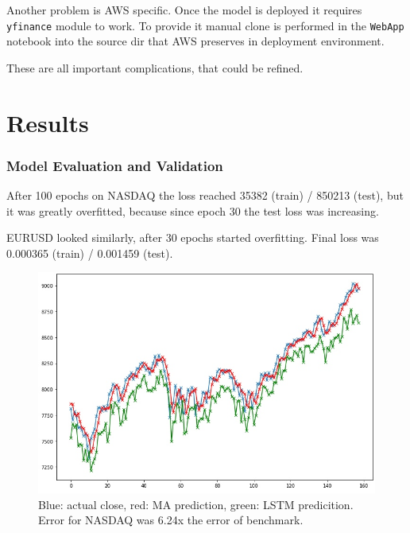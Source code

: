 \documentclass[a4paper,12pt]{article}
\begin{document}
Another problem is AWS specific. Once the model is deployed it requires \texttt{yfinance} module to work.
To provide it manual clone is performed in the \texttt{WebApp} notebook into the source dir that AWS preserves in deployment environment.

These are all important complications, that could be refined.


\part{Results}
\section{Model Evaluation and Validation}
After 100 epochs on NASDAQ the loss reached 35382 (train) / 850213 (test), but it was greatly overfitted, because since epoch 30 the test loss was increasing.

EURUSD looked similarly, after 30 epochs started overfitting. Final loss was 0.000365 (train) / 0.001459 (test).

\begin{figure}[h]
	\centering
	\includegraphics[scale=2.1]{nasdaqVs}
	\caption{Blue: actual close, red: MA prediction, green: LSTM predicition. Error for NASDAQ was 6.24x the error of benchmark.}
\end{figure}
\end{document}
